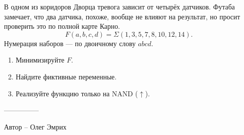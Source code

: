 \question
В одном из коридоров Дворца тревога зависит от четырёх датчиков. Футаба замечает, что два датчика, похоже, вообще не влияют на результат, но просит проверить это по полной карте Карно.
\[
F(a,b,c,d)=\Sigma(1,3,5,7,8,10,12,14).
\]
Нумерация наборов --- по двоичному слову $abcd$.
\begin{enumerate}
\item Минимизируйте $F$.
\item Найдите фиктивные переменные.
\item Реализуйте функцию только на NAND ($\uparrow$).
\end{enumerate}

---------------

Автор -- Олег Эмрих
